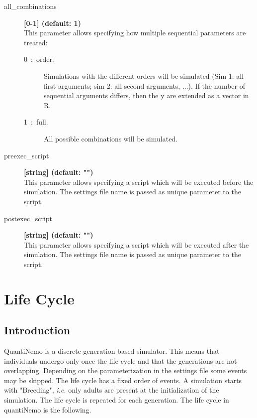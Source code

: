 \documentclass[letterpaper,12pt,oneside]{book}
\begin{document}
\begin{description}
\item[all\_combinations] \textbf{[0-1] (default: 1)}\\
This parameter allows specifying how multiple sequential parameters are treated:
\begin{description}
    \item[0~:~order.] Simulations with the different orders will be simulated (Sim 1: all first arguments; sim 2: all second arguments, ...). If the number of sequential arguments differs, then the y are extended as a vector in R.
    \item[1~:~full.] All possible combinations will be simulated. 
\end{description}

\item[preexec\_script] \textbf{[string] (default: "")}\\
This parameter allows specifying a script which will be executed before the simulation. The settings file name is passed as unique parameter to the script.

\item[postexec\_script] \textbf{[string] (default: "")}\\
This parameter allows specifying a script which will be executed after the simulation. The settings file name is passed as unique parameter to the script.
\end{description}


\newpage
\chapter{Life Cycle}\label{chap:LifeCycle}
\section{Introduction}
QuantiNemo is a discrete generation-based simulator. This means that individuals undergo only once the life cycle and that the generations are not overlapping. Depending on the parameterization in the settings file some events may be skipped. The life cycle has a fixed order of events. A simulation starts with "Breeding", \textit{i.e.} only adults are present at the initialization of the simulation. The life cycle is repeated for each generation. The life cycle in quantiNemo is the following.  
\end{document}

